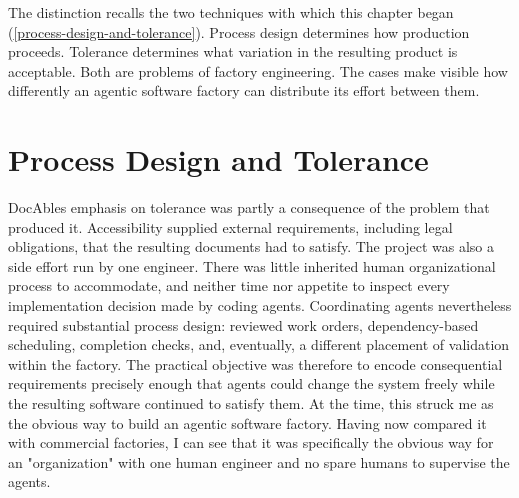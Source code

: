 The distinction recalls the two techniques with which this chapter began (\autoref{process-design-and-tolerance}). Process design determines how production proceeds. Tolerance determines what variation in the resulting product is acceptable. Both are problems of factory engineering. The cases make visible how differently an agentic software factory can distribute its effort between them.

\section{Process Design and Tolerance}\label{heading:process-design-and-tolerance}


DocAble\textquotesingle s emphasis on tolerance was partly a consequence of the problem that produced it. Accessibility supplied external requirements, including legal obligations, that the resulting documents had to satisfy. The project was also a side effort run by one engineer. There was little inherited human organizational process to accommodate, and neither time nor appetite to inspect every implementation decision made by coding agents. Coordinating agents nevertheless required substantial process design: reviewed work orders, dependency-based scheduling, completion checks, and, eventually, a different placement of validation within the factory. The practical objective was therefore to encode consequential requirements precisely enough that agents could change the system freely while the resulting software continued to satisfy them. At the time, this struck me as the obvious way to build an agentic software factory. Having now compared it with commercial factories, I can see that it was specifically the obvious way for an "organization" with one human engineer and no spare humans to supervise the agents.


